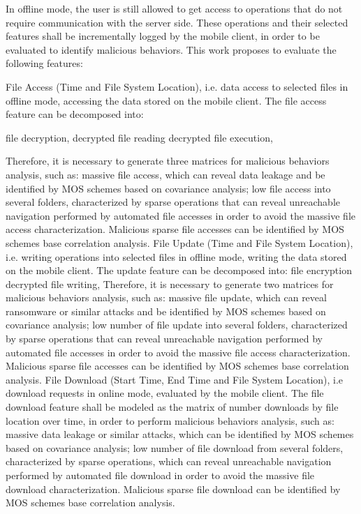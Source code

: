 \documentclass[twocolumn]{svjour3}          	%
\begin{document}
In offline mode, the user is still allowed to get access to operations that do not require communication with the server side. These operations and their selected features shall be incrementally logged by the mobile client, in order to be evaluated to identify malicious behaviors. This work proposes to evaluate the following features:

File Access (Time and File System Location), i.e. data access to selected files in offline mode, accessing the data stored on the mobile client. The file access feature can be decomposed into:

file decryption, 
decrypted file reading 
decrypted file execution, 

Therefore, it is necessary to generate three matrices for malicious behaviors analysis, such as: 
massive file access, which can reveal data leakage and be identified by MOS schemes based on covariance analysis; 
low file access into several folders, characterized by sparse operations that can reveal unreachable navigation performed by automated file accesses in order to avoid the massive file access characterization. 
Malicious sparse file accesses can be identified by MOS schemes base correlation analysis.
File Update (Time and File System Location), i.e. writing operations into selected files in offline mode, writing the data stored on the mobile client. The update feature can be decomposed into:
 file encryption 
decrypted file writing, 
Therefore, it is necessary to generate two matrices for malicious behaviors analysis, such as: 
massive file update, which can reveal ransomware or similar attacks and be identified by MOS schemes based on covariance analysis; 
low number of file update into several folders, characterized by sparse operations that can reveal unreachable navigation performed by automated file accesses in order to avoid the massive file access characterization. Malicious sparse file accesses can be identified by MOS schemes base correlation analysis.
File Download (Start Time, End Time and File System Location), i.e download requests in online mode, evaluated by the mobile client. The file download feature shall be modeled as the matrix of number downloads by file location over time, in order to perform malicious behaviors analysis, such as:
massive data leakage or similar attacks, which can be identified by MOS schemes based on covariance analysis; 
low number of file download from several folders, characterized by sparse operations, which can reveal unreachable navigation performed by automated file download in order to avoid the massive file download characterization. Malicious sparse file download can be identified by MOS schemes base correlation analysis.
\end{document}
